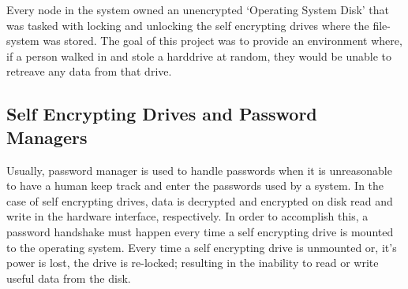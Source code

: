 \documentclass[11pt]{article} %
\def\pm{password manager\xspace}
\def\sed{self encrypting drive\xspace}
\def\seds{\sed{s}\xspace}
\begin{document}
\begin{center}
\end{center}

Every node in the system owned an unencrypted `Operating System Disk' that was tasked with locking and unlocking the \seds where the file-system was stored. The goal of this project was to provide an environment where, if a person walked in and stole a harddrive at random, they would be unable to retreave any data from that drive.

\subsection*{Self Encrypting Drives and Password Managers}

Usually, \pm is used to handle passwords when it is unreasonable to have a human keep track and enter the passwords used by a system. In the case of \seds, data is decrypted and encrypted on disk read and write in the hardware interface, respectively. In order to accomplish this, a password handshake must happen every time a \sed is mounted to the operating system. Every time a \sed is unmounted or, it's power is lost, the drive is re-locked; resulting in the inability to read or write useful data from the disk.
\end{document}

